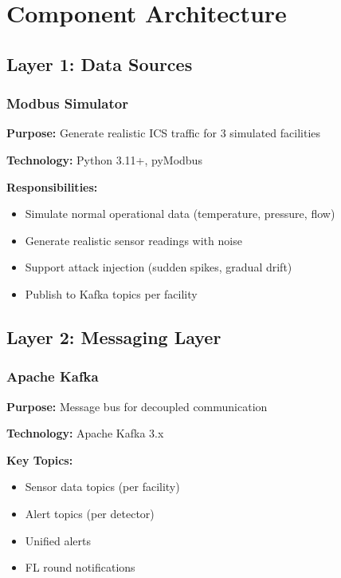\documentclass[12pt,a4paper]{article}
\begin{document}
\section{Component Architecture}

\subsection{Layer 1: Data Sources}

\subsubsection{Modbus Simulator}

\textbf{Purpose:} Generate realistic ICS traffic for 3 simulated facilities

\textbf{Technology:} Python 3.11+, pyModbus

\textbf{Responsibilities:}
\begin{itemize}[leftmargin=1cm,itemsep=0pt]
    \item Simulate normal operational data (temperature, pressure, flow)
    \item Generate realistic sensor readings with noise
    \item Support attack injection (sudden spikes, gradual drift)
    \item Publish to Kafka topics per facility
\end{itemize}

\subsection{Layer 2: Messaging Layer}

\subsubsection{Apache Kafka}

\textbf{Purpose:} Message bus for decoupled communication

\textbf{Technology:} Apache Kafka 3.x

\textbf{Key Topics:}
\begin{itemize}[leftmargin=1cm,itemsep=0pt]
    \item Sensor data topics (per facility)
    \item Alert topics (per detector)
    \item Unified alerts
    \item FL round notifications
\end{itemize}
\end{document}

